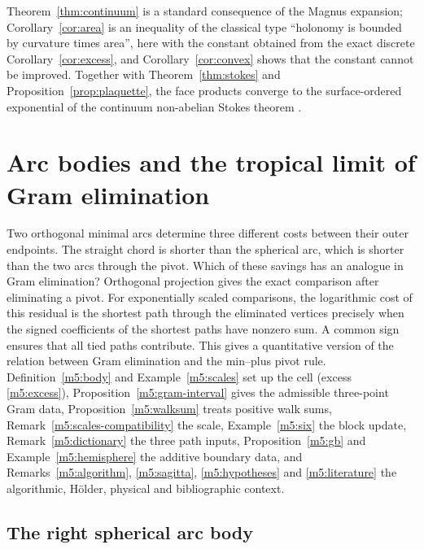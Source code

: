 \documentclass[11pt,reqno]{amsart}
\theoremstyle{definition}
\theoremstyle{remark}
\numberwithin{equation}{section}
\begin{document}
Theorem~\ref{thm:continuum} is a standard consequence of the Magnus expansion; Corollary~\ref{cor:area} is an inequality
of the classical type ``holonomy is bounded by curvature times area'', here with the constant obtained from the exact
discrete Corollary~\ref{cor:excess}, and Corollary~\ref{cor:convex} shows that the constant cannot be improved.  Together with Theorem~\ref{thm:stokes} and Proposition~\ref{prop:plaquette}, the face
products converge to the surface-ordered exponential of the continuum non-abelian Stokes theorem \cite{Arefeva,KMR}.

\setcounter{section}{0}
\renewcommand{\thesection}{9\Alph{section}}
\renewcommand{\theHsection}{arcA.\arabic{section}}
\section{Arc bodies and the tropical limit of Gram elimination}
\label{sec:m5}

Two orthogonal minimal arcs determine three different costs between their
outer endpoints. The straight chord is shorter than the spherical arc, which
is shorter than the two arcs through the pivot. Which of these savings has an
analogue in Gram elimination? Orthogonal projection gives the exact
comparison after eliminating a pivot. For exponentially scaled comparisons,
the logarithmic cost of this residual is the shortest path through the
eliminated vertices precisely when the signed coefficients of the shortest
paths have nonzero sum. A common sign ensures that all tied paths contribute.
This gives a quantitative version of the relation between Gram elimination and
the min--plus pivot rule.  Definition~\ref{m5:body} and Example~\ref{m5:scales} set up the cell (excess \eqref{m5:excess}),
Proposition~\ref{m5:gram-interval} gives the admissible three-point Gram data, Proposition~\ref{m5:walksum} treats positive walk sums,
Remark~\ref{m5:scales-compatibility} the scale, Example~\ref{m5:six} the block update, Remark~\ref{m5:dictionary} the three path inputs,
Proposition~\ref{m5:gb} and Example~\ref{m5:hemisphere} the additive boundary data, and Remarks~\ref{m5:algorithm}, \ref{m5:sagitta},
\ref{m5:hypotheses} and \ref{m5:literature} the algorithmic, H\"older, physical and bibliographic context.

\subsection{The right spherical arc body}
\end{document}
